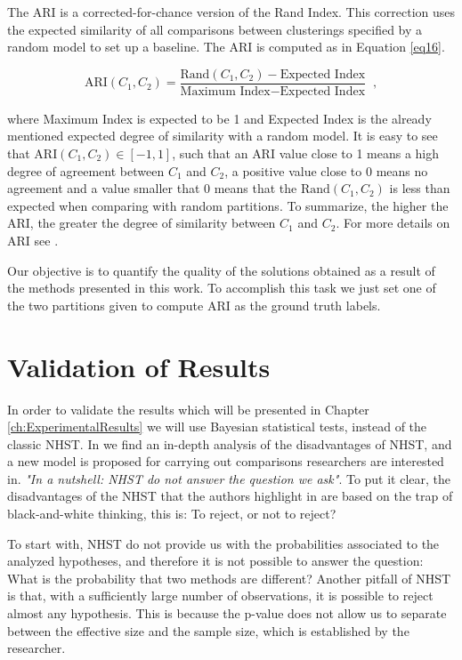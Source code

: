 The \acs{ARI} is a corrected-for-chance version of the Rand Index. This correction uses the expected similarity of all comparisons between clusterings specified by a random model to set up a baseline. The \acs{ARI} is computed as in Equation \eqref{eq16}.

\begin{equation}
\text{ARI}(C_1, C_2) = \frac{\text{Rand}(C_1, C_2) - \text{Expected Index}}{\text{Maximum Index} - \text{Expected Index}}\;\;,
\label{eq16}
\end{equation}

\noindent where Maximum Index is expected to be 1 and Expected Index is the already mentioned expected degree of similarity with a random model. It is easy to see that $\text{ARI}(C_1, C_2) \in [-1,1]$, such that an \acs{ARI} value close to 1 means a high degree of agreement between $C_1$ and $C_2$, a positive value close to 0 means no agreement and a value smaller that 0 means that the $\text{Rand}(C_1, C_2)$ is less than expected when comparing with random partitions. To summarize, the higher the \acs{ARI}, the greater the degree of similarity between $C_1$ and $C_2$. For more details on \acs{ARI} see \cite{hubert1985comparing}.

Our objective is to quantify the quality of the solutions obtained as a result of the methods presented in this work. To accomplish this task we just set one of the two partitions given to compute \acs{ARI} as the ground truth labels.

\section{Validation of Results} \label{sec:ValidtnMethod}

In order to validate the results which will be presented in Chapter \ref{ch:ExperimentalResults} we will use Bayesian statistical tests, instead of the classic \acf{NHST}. In \cite{benavoli2017time} we find an in-depth analysis of the disadvantages of \acs{NHST}, and a new model is proposed for carrying out comparisons researchers are interested in. \textit{"In a nutshell: \acs{NHST} do not answer the question we ask"}. To put it clear, the disadvantages of the \acs{NHST} that the authors highlight in \cite{benavoli2017time} are based on the trap of black-and-white thinking, this is: To reject, or not to reject?

To start with, \acs{NHST} do not provide us with the probabilities associated to the analyzed hypotheses, and therefore it is not possible to answer the question: What is the probability that two methods are different? Another pitfall of \acs{NHST} is that, with a sufficiently large number of observations, it is possible to reject almost any hypothesis. This is because the p-value does not allow us to separate between the effective size and the sample size, which is established by the researcher.

